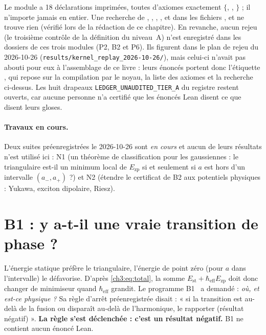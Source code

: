\begin{warnbox}
Le module  a 18 déclarations imprimées, toutes d'axiomes exactement
$\{$, , $\}$ ; il n'importe jamais  en entier.
Une recherche de , , , ,  et
 dans les fichiers ,  et
 ne trouve rien (vérifié lors de la rédaction de ce chapitre). En revanche, aucun rejeu
 (le troisième contrôle de la définition du niveau~A) n'est enregistré dans les dossiers de ces trois
modules (P2, B2 et P6). Ils figurent dans le plan de rejeu du 2026-10-26 (\texttt{results/kernel\_replay\_2026-10-26/}),
mais celui-ci n'avait pas abouti pour eux à l'assemblage de ce livre : leurs énoncés portent donc l'étiquette \tierAs{},
qui repose sur la compilation par le noyau, la liste des axiomes et la recherche ci-dessus. Les huit drapeaux \texttt{LEDGER\_UNAUDITED\_TIER\_A} du registre restent ouverts, car aucune
personne n'a certifié que les énoncés Lean disent ce que disent leurs gloses.
\end{warnbox}

\paragraph{Travaux en cours.} Deux suites préenregistrées le 2026-10-26 sont \emph{en cours} et aucun de leurs résultats
n'est utilisé ici : N1 (un théorème de classification pour les gaussiennes : le triangulaire est-il un minimum local de
$E_{\mathrm{zp}}$ si et seulement si $a$ est hors d'un intervalle $(a_-,a_+)$ ?) et N2 (étendre le certificat de B2 aux
potentiels physiques : Yukawa, exciton dipolaire, Riesz).

\section{B1 : y a-t-il une vraie transition de phase ?}\label{ch3:sec:transition}
L'énergie statique préfère le triangulaire, l'énergie de point zéro (pour $a$ dans l'intervalle) le défavorise. D'après
\eqref{ch3:eq:total}, la somme $E_{\mathrm{st}}+\hbar_{\mathrm{eff}}E_{\mathrm{zp}}$ doit donc changer de minimiseur
quand $\hbar_{\mathrm{eff}}$ grandit. Le programme B1~\cite{ch3-b1} a demandé : \emph{où, et est-ce physique ?} Sa
règle d'arrêt préenregistrée disait : « si la transition est au-delà de la fusion ou disparaît au-delà de l'harmonique,
le rapporter (résultat négatif) ». \textbf{La règle s'est déclenchée : c'est un résultat négatif.} B1 ne contient aucun
énoncé Lean.

